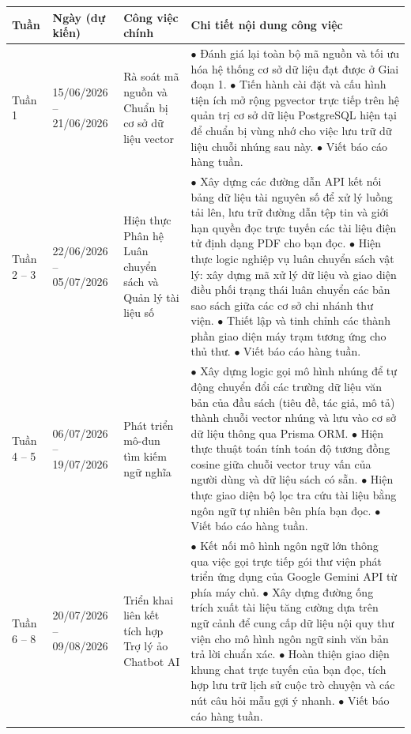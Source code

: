 \bigskip
{}

\begin{longtable}{|p{1.8cm}|p{2.6cm}|p{3.5cm}|p{8.1cm}|}
\hline
\textbf{Tuần} & \textbf{Ngày (dự kiến)} & \textbf{Công việc chính} & \textbf{Chi tiết nội dung công việc} \\
\hline
Tuần 1 & 15/06/2026 -- 21/06/2026 & Rà soát mã nguồn và Chuẩn bị cơ sở dữ liệu vector & $\bullet$ Đánh giá lại toàn bộ mã nguồn và tối ưu hóa hệ thống cơ sở dữ liệu đạt được ở Giai đoạn 1. \newline $\bullet$ Tiến hành cài đặt và cấu hình tiện ích mở rộng pgvector trực tiếp trên hệ quản trị cơ sở dữ liệu PostgreSQL hiện tại để chuẩn bị vùng nhớ cho việc lưu trữ dữ liệu chuỗi nhúng sau này. \newline $\bullet$ Viết báo cáo hàng tuần. \\
\hline
Tuần 2 -- 3 & 22/06/2026 -- 05/07/2026 & Hiện thực Phân hệ Luân chuyển sách và Quản lý tài liệu số  & $\bullet$ Xây dựng các đường dẫn API kết nối bảng dữ liệu tài nguyên số để xử lý luồng tải lên, lưu trữ đường dẫn tệp tin và giới hạn quyền đọc trực tuyến các tài liệu điện tử định dạng PDF cho bạn đọc. \newline $\bullet$ Hiện thực logic nghiệp vụ luân chuyển sách vật lý: xây dựng mã xử lý dữ liệu và giao diện điều phối trạng thái luân chuyển các bản sao sách giữa các cơ sở chi nhánh thư viện. \newline $\bullet$ Thiết lập và tinh chỉnh các thành phần giao diện máy trạm tương ứng cho thủ thư. \newline $\bullet$ Viết báo cáo hàng tuần. \\
\hline
Tuần 4 -- 5 & 06/07/2026 -- 19/07/2026 & Phát triển mô-đun tìm kiếm ngữ nghĩa & $\bullet$ Xây dựng logic gọi mô hình nhúng để tự động chuyển đổi các trường dữ liệu văn bản của đầu sách (tiêu đề, tác giả, mô tả) thành chuỗi vector nhúng và lưu vào cơ sở dữ liệu thông qua Prisma ORM. \newline $\bullet$ Hiện thực thuật toán tính toán độ tương đồng cosine giữa chuỗi vector truy vấn của người dùng và dữ liệu sách có sẵn. \newline $\bullet$ Hiện thực giao diện bộ lọc tra cứu tài liệu bằng ngôn ngữ tự nhiên bên phía bạn đọc. \newline $\bullet$ Viết báo cáo hàng tuần. \\
\hline
Tuần 6 -- 8 & 20/07/2026 -- 09/08/2026 & Triển khai liên kết tích hợp Trợ lý ảo Chatbot AI & $\bullet$ Kết nối mô hình ngôn ngữ lớn thông qua việc gọi trực tiếp gói thư viện phát triển ứng dụng của Google Gemini API từ phía máy chủ. \newline $\bullet$ Xây dựng đường ống trích xuất tài liệu tăng cường dựa trên ngữ cảnh để cung cấp dữ liệu nội quy thư viện cho mô hình ngôn ngữ sinh văn bản trả lời chuẩn xác. \newline $\bullet$ Hoàn thiện giao diện khung chat trực tuyến của bạn đọc, tích hợp lưu trữ lịch sử cuộc trò chuyện và các nút câu hỏi mẫu gợi ý nhanh. \newline $\bullet$ Viết báo cáo hàng tuần. \\

\end{longtable}
